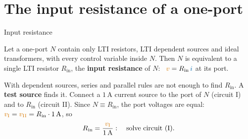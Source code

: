 \documentclass[11pt,a4paper]{article}
\newcommand{\Icol}[1]{\textcolor{ccur}{#1}}
\newcommand{\Vcol}[1]{\textcolor{cvolt}{#1}}
\newcommand{\uni}[1]{\,\mathrm{#1}}
\newcommand{\A}{\uni{A}}   \newcommand{\V}{\uni{V}}
\newcommand{\Rin}{R_{\mathrm{in}}}
\newcommand{\oneport}[2][1.9]{%
  \draw[elem] (0,0) rectangle (#1,2);
  \node[align=center, font=\small] at ({#1/2},1) {#2};
  \begin{scope}[shift={(#1-1.9,0)}]
  \draw (1.9,1.7) -- (3.0,1.7) node[ocirc] {} node[right, tlab] {a};
  \draw (1.9,0.3) -- (3.0,0.3) node[ocirc] {} node[right, tlab] {b};
  \draw[iar] (2.75,1.95) -- (2.2,1.95); \node[font=\small, text=ccur] at (2.48,2.2) {$i$};
  \node[pol] at (2.6,1.4) {$+$}; \node[pol] at (2.6,0.6) {$-$};
  \node[font=\small, text=cvolt] at (2.6,1.0) {$v$};
  \end{scope}}
\newcommand{\rinres}{%
  \draw (1.1,1.7) -- (0,1.7) to[R, l_=$\Rin$] (0,0.3) -- (1.1,0.3);
  \draw (1.1,1.7) node[ocirc] {} node[right, tlab] {a};
  \draw (1.1,0.3) node[ocirc] {} node[right, tlab] {b};}
\newcommand{\testcfg}[1]{%
  \ifnum#1=0
    \draw[elem] (0,0) rectangle (1.5,2); \node at (0.75,1) {$N$};
    \draw (1.5,1.7) -- (2.9,1.7); \draw (1.5,0.3) -- (2.9,0.3);
    \draw (2.9,0.3) to[american current source, l_=$1\A$] (2.9,1.7);
    \node[pol] at (2.05,1.35) {$+$}; \node[pol] at (2.05,0.65) {$-$};
    \node[font=\small, text=cvolt] at (2.05,1.0) {$v_{\mathrm{I}}$};
    \fill (2.9,1.7) circle (1.6pt); \fill (2.9,0.3) circle (1.6pt);
  \else
    \draw (2.9,1.7) -- (0.5,1.7) to[R, l_=$\Rin$] (0.5,0.3) -- (2.9,0.3);
    \draw (2.9,0.3) to[american current source, l_=$1\A$] (2.9,1.7);
    \node[pol] at (1.75,1.35) {$+$}; \node[pol] at (1.75,0.65) {$-$};
    \node[font=\small, text=cvolt] at (1.75,1.0) {$v_{\mathrm{II}}$};
    \fill (2.9,1.7) circle (1.6pt); \fill (2.9,0.3) circle (1.6pt);
  \fi}
\begin{document}
\section{The input resistance of a one-port}

\begin{definitionbox}{Input resistance}
\begin{minipage}[c]{0.5\linewidth}
Let a one-port $N$ contain only LTI resistors, LTI dependent sources and ideal transformers,
with every control variable inside $N$. Then $N$ is equivalent to a single LTI resistor
$\Rin$, the \textbf{input resistance} of $N$: \ $\Vcol{v} = \Rin\,\Icol{i}$ at its port.
\end{minipage}\hfill
\begin{minipage}[c]{0.46\linewidth}
\centering
{}
\end{minipage}
\end{definitionbox}

\begin{minipage}[c]{0.5\linewidth}
With dependent sources, series and parallel rules are not enough to find $\Rin$. A
\textbf{test source} finds it. Connect a $1\A$ current source to the port of $N$ (circuit I)
and to $\Rin$ (circuit II). Since $N \equiv \Rin$, the port voltages are equal:
$\Vcol{v_{\mathrm{I}}} = \Vcol{v_{\mathrm{II}}} = \Rin \cdot 1\A$, so
\[
  \Rin = \frac{\Vcol{v_{\mathrm{I}}}}{1\A}: \quad \text{solve circuit (I)}.
\]
\end{minipage}\hfill
\begin{minipage}[c]{0.46\linewidth}
\centering
{}
\end{minipage}
\end{document}
